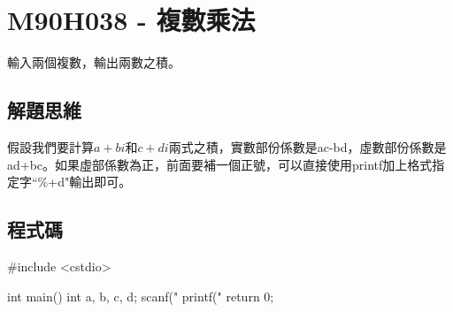 \section{M90H038 - 複數乘法}
輸入兩個複數，輸出兩數之積。

\subsection{解題思維}
假設我們要計算$a+bi$和$c+di$兩式之積，實數部份係數是ac-bd，虛數部份係數是ad+bc。如果虛部係數為正，前面要補一個正號，可以直接使用printf加上格式指定字``\%+d"輸出即可。
\subsection{程式碼}
\begin{cppcode}
	#include <cstdio>

	int main()
	{
		int a, b, c, d;
		scanf("%
		printf("%
		return 0;
	}
\end{cppcode}
